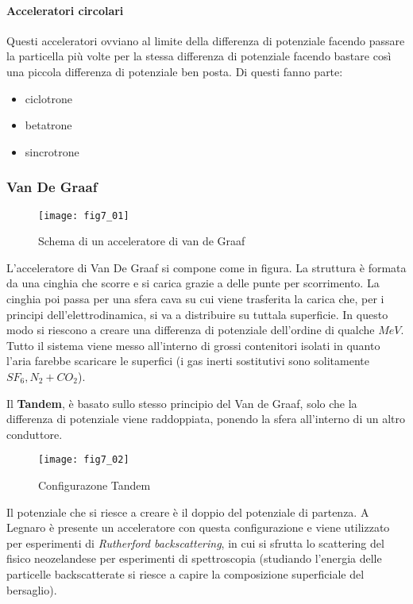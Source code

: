 \paragraph{Acceleratori circolari}
Questi acceleratori ovviano al limite della differenza di potenziale facendo passare la particella più volte per la stessa differenza di potenziale facendo bastare così una piccola differenza di potenziale ben posta.
Di questi fanno parte:
\begin{itemize}
\item ciclotrone
\item betatrone
\item sincrotrone
\end{itemize}

\subsubsection{Van De Graaf}
\begin{figure}[h]
\centering 
\texttt{[image: fig7\_01]}
\caption{Schema di un acceleratore di van de Graaf}
\end{figure}
L'acceleratore di Van De Graaf si compone come in figura.
La struttura è formata da una cinghia che scorre e si carica grazie a delle punte per scorrimento.
La cinghia poi passa per una sfera cava su cui viene trasferita la carica che, per i principi dell'elettrodinamica, si va a distribuire su tuttala superficie.
In questo modo si riescono a creare una differenza di potenziale dell'ordine di qualche $MeV$.
Tutto il sistema viene messo all'interno di grossi contenitori isolati in quanto l'aria farebbe scaricare le superfici (i gas inerti sostitutivi sono solitamente $SF_6, N_2+CO_2$).

Il \textbf{Tandem}, è basato sullo stesso principio del Van de Graaf, solo che la differenza di potenziale viene raddoppiata, ponendo la sfera all'interno di un altro conduttore.
\begin{figure}[h]
\centering
\texttt{[image: fig7\_02]}
\caption{Configurazone Tandem}
\end{figure}
Il potenziale che si riesce a creare è il doppio del potenziale di partenza.
A Legnaro è presente un acceleratore con questa configurazione e viene utilizzato per esperimenti di \emph{Rutherford backscattering}, in cui si sfrutta lo scattering del fisico neozelandese per esperimenti di spettroscopia (studiando l'energia delle particelle backscatterate si riesce a capire la composizione superficiale del bersaglio).

